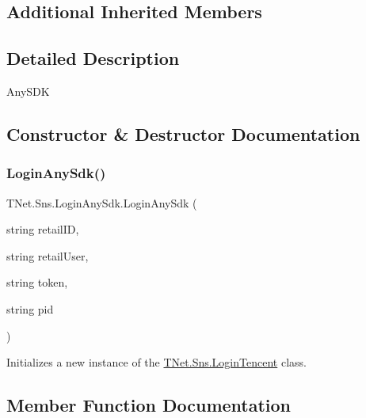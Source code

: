 \subsection*{Additional Inherited Members}


\subsection{Detailed Description}
Any\+S\+DK 



\subsection{Constructor \& Destructor Documentation}
\mbox{\label{class_t_net_1_1_sns_1_1_login_any_sdk_a717769a77709916f902b286e501ef0c3}} 
\subsubsection{\texorpdfstring{Login\+Any\+Sdk()}{LoginAnySdk()}}
{\footnotesize\ttfamily T\+Net.\+Sns.\+Login\+Any\+Sdk.\+Login\+Any\+Sdk (\begin{DoxyParamCaption}\item[{string}]{retail\+ID,  }\item[{string}]{retail\+User,  }\item[{string}]{token,  }\item[{string}]{pid }\end{DoxyParamCaption})}



Initializes a new instance of the \mbox{\hyperlink{class_t_net_1_1_sns_1_1_login_tencent}{T\+Net.\+Sns.\+Login\+Tencent}} class. 



\subsection{Member Function Documentation}
\mbox{\label{class_t_net_1_1_sns_1_1_login_any_sdk_a88210952068fcd88986d273ea6b04e86}} 

